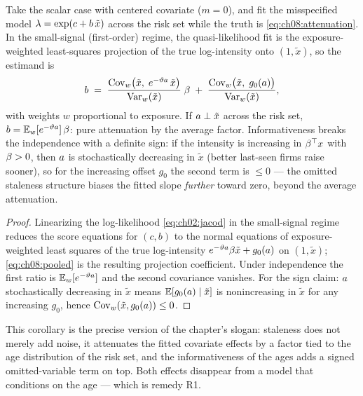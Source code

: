 \begin{corollary}\label{cor:ch08:pooled}
Take the scalar case with centered covariate ($m = 0$), and fit the
misspecified model $\lambda = \exp(c + b\,\tilde x)$ across the risk set
while the truth is \cref{eq:ch08:attenuation}. In the small-signal
(first-order) regime, the quasi-likelihood fit is the exposure-weighted
least-squares projection of the true log-intensity onto $(1, \tilde x)$,
so the estimand is
\begin{equation}\label{eq:ch08:pooled}
b
 \;=\;
 \frac{\operatorname{Cov}_w\!\big(\tilde x,\; e^{-\vartheta a}\,\tilde x\big)}
      {\operatorname{Var}_w(\tilde x)}\;\beta
 \;+\;
 \frac{\operatorname{Cov}_w\!\big(\tilde x,\; g_0(a)\big)}{\operatorname{Var}_w(\tilde x)},
\end{equation}
with weights $w$ proportional to exposure. If $a \perp \tilde x$
across the risk set, $b = \mathbb{E}_w[e^{-\vartheta a}]\,\beta$: pure
attenuation by the average factor. Informativeness breaks the
independence with a definite sign: if the intensity is increasing in
$\beta^{\top}x$ with $\beta > 0$, then $a$ is stochastically
decreasing in $\tilde x$ (better last-seen firms raise sooner), so for
the increasing offset $g_0$ the second term is $\le 0$ --- the omitted
staleness structure biases the fitted slope \emph{further} toward zero,
beyond the average attenuation.
\end{corollary}

\begin{proof}
Linearizing the log-likelihood \cref{eq:ch02:jacod} in the small-signal
regime reduces the score equations for $(c,b)$ to the normal equations of
exposure-weighted least squares of the true log-intensity
$e^{-\vartheta a}\beta \tilde x + g_0(a)$ on $(1,\tilde x)$;
\cref{eq:ch08:pooled} is the resulting projection coefficient. Under
independence the first ratio is $\mathbb{E}_w[e^{-\vartheta a}]$ and the second
covariance vanishes. For the sign claim: $a$ stochastically
decreasing in $\tilde x$ means $\mathbb{E}[g_0(a)\mid \tilde x]$ is
nonincreasing in $\tilde x$ for any increasing $g_0$, hence
$\operatorname{Cov}_w(\tilde x, g_0(a)) \le 0$.
\end{proof}

This corollary is the precise version of the chapter's slogan: staleness
does not merely add noise, it attenuates the fitted covariate effects by
a factor tied to the age distribution of the risk set, and the
informativeness of the ages adds a signed omitted-variable term on top.
Both effects disappear from a model that conditions on the age --- which
is remedy R1.

